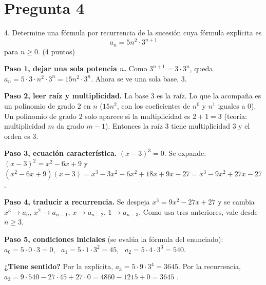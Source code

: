 \documentclass[11pt]{article}
\begin{document}
\section*{Pregunta 4}

4. Determine una \colorbox{green!35}{fórmula por recurrencia} de la sucesión cuya fórmula explícita es
\[a_n=5n^2\cdot 3^{n+1}\]
para $n\ge0$. \hfill (4 puntos)

\begin{center}
\end{center}


\begin{explica}
\textbf{Paso 1, dejar una sola potencia $n$.} Como $3^{n+1}=3\cdot3^n$, queda $a_n=5\cdot3\cdot n^2\cdot3^n=15n^2\cdot 3^n$. Ahora se ve una sola base, $3$.

\textbf{Paso 2, leer raíz y multiplicidad.} La base $3$ es la raíz. Lo que la acompaña es un polinomio de grado $2$ en $n$ ($15n^2$, con los coeficientes de $n^0$ y $n^1$ iguales a $0$). Un polinomio de grado $2$ solo aparece si la multiplicidad es $2+1=3$ (teoría: multiplicidad $m$ da grado $m-1$). Entonces la raíz $3$ tiene multiplicidad $3$ y el orden es $3$.

\textbf{Paso 3, ecuación característica.} $(x-3)^3=0$. Se expande: $(x-3)^2=x^2-6x+9$ y $(x^2-6x+9)(x-3)=x^3-3x^2-6x^2+18x+9x-27=x^3-9x^2+27x-27$.

\textbf{Paso 4, traducir a recurrencia.} Se despeja $x^3=9x^2-27x+27$ y se cambia $x^3\to a_n$, $x^2\to a_{n-1}$, $x\to a_{n-2}$, $1\to a_{n-3}$. Como usa tres anteriores, vale desde $n\ge3$.

\textbf{Paso 5, condiciones iniciales} (se evalúa la fórmula del enunciado):
$a_0=5\cdot0\cdot3=0$, \ $a_1=5\cdot1\cdot3^2=45$, \ $a_2=5\cdot4\cdot3^3=540$.

\textbf{¿Tiene sentido?} Por la explícita, $a_3=5\cdot9\cdot3^4=3645$. Por la recurrencia, $a_3=9\cdot540-27\cdot45+27\cdot0=4860-1215+0=3645$ \checkmark.
\end{explica}
\end{document}
